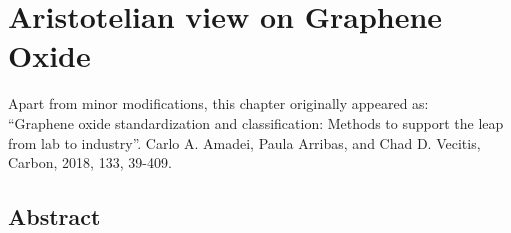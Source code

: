 \chapter{Aristotelian view on Graphene Oxide}
\thispagestyle{plain}
\vspace{-.5cm}

\noindent Apart from minor modifications, this chapter originally appeared as:\newline\\
\ssp ``Graphene oxide standardization and classification: Methods to support the leap from lab to industry''. 
Carlo A. Amadei, Paula Arribas, and Chad D. Vecitis, Carbon, 2018, 133, 39-409.


\section*{Abstract}
    \dsp
    


